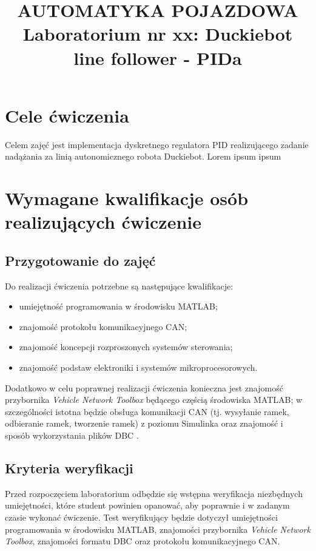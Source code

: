 \documentclass[11pt,onecolumn]{article}
\begin{document}
\title{\textbf{AUTOMATYKA POJAZDOWA} \\
Laboratorium nr xx: Duckiebot line follower - PIDa}
\date{}

\maketitle

\section{Cele ćwiczenia} \label{sec:cele}
%
Celem zajęć jest implementacja dyskretnego regulatora PID realizującego zadanie nadążania za linią autonomicznego robota Duckiebot. Lorem ipsum ipsum
%
\section{Wymagane kwalifikacje osób realizujących ćwiczenie} \label{sec:kwalifikacje}
%
\subsection{Przygotowanie do zajęć} \label{sub:przygotowanie}
%
Do realizacji ćwiczenia potrzebne są następujące kwalifikacje: 
\begin{itemize}
   \item umiejętność programowania w środowisku MATLAB;
   \item znajomość protokołu komunikacyjnego CAN;
   \item znajomość koncepcji rozproszonych systemów sterowania;
   \item znajomość podstaw elektroniki i systemów mikroprocesorowych.
\end{itemize}

Dodatkowo w celu poprawnej realizacji ćwiczenia konieczna jest znajomość przybornika \emph{Vehicle Network Toolbox} \cite{MathWorks19_VNT} będącego częścią środowiska MATLAB; w szczególności istotna będzie obsługa komunikacji CAN (tj. wysyłanie ramek, odbieranie ramek, tworzenie ramek) z poziomu Simulinka oraz znajomość i sposób wykorzystania plików DBC \cite{SL_DBC,Vector_DBC}. 

%
\subsection{Kryteria weryfikacji} \label{sub:kryteria_wer}
%
Przed rozpoczęciem laboratorium odbędzie się wstępna weryfikacja niezbędnych umiejętności, które student powinien opanować, aby poprawnie i w zadanym czasie wykonać ćwiczenie. Test weryfikujący będzie dotyczył umiejętności programowania w środowisku MATLAB, znajomości przybornika \emph{Vehicle Network Toolbox}, znajomości formatu DBC oraz protokołu komunikacyjnego CAN.
\end{document}
